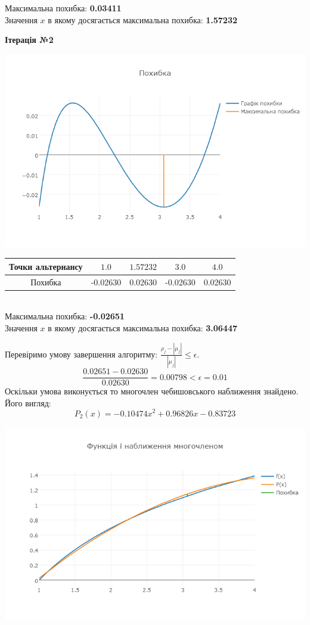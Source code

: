 \documentclass[ukrainian,14pt]{extarticle}
\begin{document}
\noindent
Максимальна похибка: \textbf{0.03411}\\
Значення $x$ в якому досягається максимальна похибка: \textbf{1.57232}


\newpage

\begin{center}
\textbf{Ітерація №2}
\end{center}

\includegraphics[scale=0.65]{log_err2}
\begin{tabular}{|c|c|c|c|c|}
\hline
\rule{0pt}{4ex} 
Точки альтернансу & $1.0$ & $1.57232$ & $3.0$ & $4.0$ \\ \hline
\rule{0pt}{4ex} 
Похибка & -0.02630 & 0.02630 & -0.02630 & 0.02630   \\ \hline 
\end{tabular}\\

\noindent
Максимальна похибка: \textbf{-\textsc{0.02651}}\\
Значення $x$ в якому досягається максимальна похибка: \textbf{3.06447}

\newpage

Перевіримо умову завершення алгоритму: $\frac{\rho_j - |\mu_j|}{|\mu_j|} \leq \epsilon.$ \\

$$\frac{0.02651 - 0.02630}{0.02630} = 0.00798 < \epsilon = 0.01$$
Оскільки умова виконується  то многочлен чебишовського наближення знайдено. Його вигляд:\\
$$P_2(x) = -0.10474 x^{2} + 0.96826x - 0.83723$$

\includegraphics[scale=0.7]{log}
\end{document}
